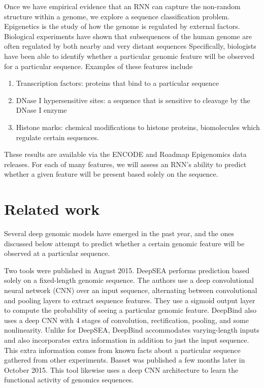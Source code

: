 \documentclass{article} %
\begin{document}
Once we have empirical evidence that an RNN can capture the non-random structure within a genome, we explore a sequence classification problem. Epigenetics is the study of how the genome is regulated by external factors. Biological experiments have shown that subsequences of the human genome are often regulated by both nearby and very distant sequences Specifically, biologists have been able to identify whether a particular genomic feature will be observed for a particular sequence. Examples of these features include
\begin{enumerate}
	\item Transcription factors: proteins that bind to a particular sequence
	\item DNase I hypersensitive sites: a sequence that is sensitive to cleavage by the DNase I enzyme
	\item Histone marks: chemical modifications to histone proteins, biomolecules  which regulate certain sequences.
\end{enumerate}

These results are available via the ENCODE \cite{encode2012integrated} and Roadmap Epigenomics \cite{kundaje2015integrative} data releases. For each of many features, we will assess an RNN's ability to predict whether a given feature will be present based solely on the sequence.

\section{Related work}

Several deep genomic models have emerged in the past year, and the ones discussed below attempt to predict whether a certain genomic feature will be observed at a particular sequence.

Two tools were published in August 2015. DeepSEA \cite{zhou2015predicting} performs prediction based solely on a fixed-length genomic sequence. The authors use a deep convolutional neural network (CNN) over an input sequence, alternating between convolutional and pooling layers to extract sequence features. They use a sigmoid output layer to compute the probability of seeing a particular genomic feature. DeepBind \cite{alipanahi2015predicting} also uses a deep CNN with 4 stages of convolution, rectification, pooling, and some nonlinearity. Unlike for DeepSEA, DeepBind accommodates varying-length inputs and also incorporates extra information in addition to just the input sequence. This extra information comes from known facts about a particular sequence gathered from other experiments. Basset \cite{kelley2015basset} was published a few months later in October 2015. This tool likewise uses a deep CNN architecture to learn the functional activity of genomics sequences.
\end{document}
